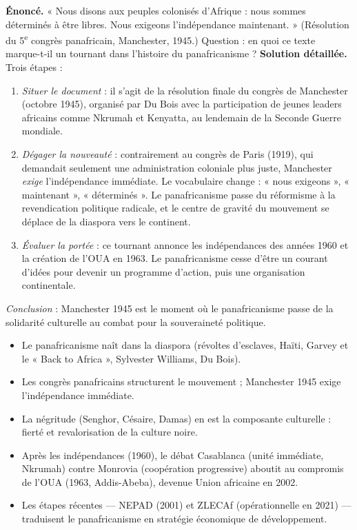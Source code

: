 \documentclass[11pt]{article}
\newcommand{\cle}[1]{{\popxbold\color{popdark}#1}}
\begin{document}
\begin{exoresolu}
\textbf{\'Enonc\'e.} « Nous disons aux peuples colonis\'es d'Afrique : nous sommes d\'etermin\'es \`a \^etre libres. Nous exigeons l'ind\'ependance maintenant. » (R\'esolution du 5\textsuperscript{e} congr\`es panafricain, Manchester, 1945.) Question : en quoi ce texte marque-t-il un tournant dans l'histoire du panafricanisme ?
\tcblower
\textbf{Solution d\'etaill\'ee.} Trois \'etapes :
\begin{enumerate}
\item \emph{Situer le document} : il s'agit de la r\'esolution finale du congr\`es de Manchester (octobre 1945), organis\'e par Du Bois avec la participation de jeunes leaders africains comme Nkrumah et Kenyatta, au lendemain de la Seconde Guerre mondiale.
\item \emph{D\'egager la nouveaut\'e} : contrairement au congr\`es de Paris (1919), qui demandait seulement une administration coloniale plus juste, Manchester \emph{exige} l'ind\'ependance imm\'ediate. Le vocabulaire change : « nous exigeons », « maintenant », « d\'etermin\'es ». Le panafricanisme passe du r\'eformisme \`a la revendication politique radicale, et le centre de gravit\'e du mouvement se d\'eplace de la diaspora vers le continent.
\item \emph{\'Evaluer la port\'ee} : ce tournant annonce les ind\'ependances des ann\'ees 1960 et la cr\'eation de l'OUA en 1963. Le panafricanisme cesse d'\^etre un courant d'id\'ees pour devenir un programme d'action, puis une organisation continentale.
\end{enumerate}
\emph{Conclusion} : Manchester 1945 est le moment o\`u le panafricanisme passe de la solidarit\'e culturelle au combat pour la souverainet\'e politique.
\end{exoresolu}

\begin{aretenir}
\begin{itemize}
\item Le panafricanisme na\^it dans la \cle{diaspora} (r\'evoltes d'esclaves, Ha\"iti, Garvey et le « Back to Africa », Sylvester Williams, Du Bois).
\item Les congr\`es panafricains structurent le mouvement ; \cle{Manchester 1945} exige l'ind\'ependance imm\'ediate.
\item La \cle{n\'egritude} (Senghor, C\'esaire, Damas) en est la composante culturelle : fiert\'e et revalorisation de la culture noire.
\item Apr\`es les ind\'ependances (1960), le d\'ebat \cle{Casablanca} (unit\'e imm\'ediate, Nkrumah) contre \cle{Monrovia} (coop\'eration progressive) aboutit au compromis de l'\cle{OUA} (1963, Addis-Abeba), devenue \cle{Union africaine} en 2002.
\item Les \'etapes r\'ecentes — \cle{NEPAD} (2001) et \cle{ZLECAf} (op\'erationnelle en 2021) — traduisent le panafricanisme en strat\'egie \'economique de d\'eveloppement.
\end{itemize}
\end{aretenir}
\end{document}
